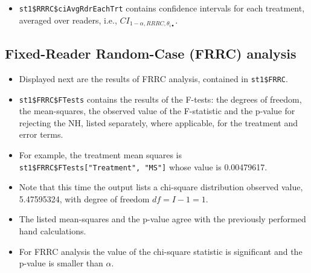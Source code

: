 \documentclass[
]{book}
\newenvironment{Shaded}{\begin{snugshade}}{\end{snugshade}}
\newcommand{\CommentTok}[1]{\textcolor[rgb]{0.56,0.35,0.01}{\textit{#1}}}
\newcommand{\DataTypeTok}[1]{\textcolor[rgb]{0.13,0.29,0.53}{#1}}
\newcommand{\DecValTok}[1]{\textcolor[rgb]{0.00,0.00,0.81}{#1}}
\newcommand{\KeywordTok}[1]{\textcolor[rgb]{0.13,0.29,0.53}{\textbf{#1}}}
\newcommand{\NormalTok}[1]{#1}
\newcommand{\OperatorTok}[1]{\textcolor[rgb]{0.81,0.36,0.00}{\textbf{#1}}}
\providecommand{\tightlist}{%
  \setlength{\itemsep}{0pt}\setlength{\parskip}{0pt}}
\begin{document}
\begin{itemize}
\tightlist
\item
  \texttt{st1\$RRRC\$ciAvgRdrEachTrt} contains confidence intervals for each treatment, averaged over readers, i.e., \(CI_{1-\alpha,RRRC,\theta_{i \bullet}}\).
\end{itemize}

\hypertarget{or-applications-FRRC-dataset02-RJafroc}{%
\subsection{Fixed-Reader Random-Case (FRRC) analysis}\label{or-applications-FRRC-dataset02-RJafroc}}

\begin{itemize}
\tightlist
\item
  Displayed next are the results of FRRC analysis, contained in \texttt{st1\$FRRC}.
\item
  \texttt{st1\$FRRC\$FTests} contains the results of the F-tests: the degrees of freedom, the mean-squares, the observed value of the F-statistic and the p-value for rejecting the NH, listed separately, where applicable, for the treatment and error terms.
\item
  For example, the treatment mean squares is \texttt{st1\$FRRC\$FTests{[}"Treatment",\ "MS"{]}} whose value is 0.00479617.
\end{itemize}

\begin{Shaded}
\end{Shaded}

\begin{itemize}
\tightlist
\item
  Note that this time the output lists a chi-square distribution observed value, 5.47595324, with degree of freedom \(df = I -1 = 1\).
\item
  The listed mean-squares and the p-value agree with the previously performed hand calculations.
\item
  For FRRC analysis the value of the chi-square statistic is significant and the p-value is smaller than \(\alpha\).
\end{itemize}
\end{document}
